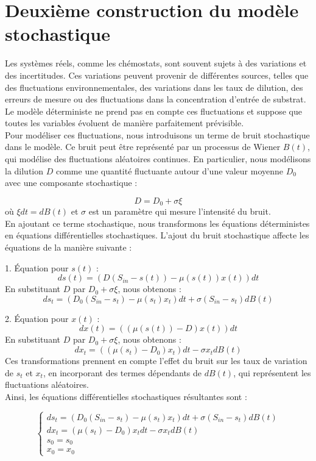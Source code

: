 \documentclass[12pt,a4paper]{report}%
\begin{document}
 \chapter{Deuxième construction du modèle stochastique}
 Les systèmes réels, comme les chémostats, sont souvent sujets à des variations et des incertitudes. Ces variations peuvent provenir de différentes sources, telles que des fluctuations environnementales, des variations dans les taux de dilution, des erreurs de mesure ou des fluctuations dans la concentration d'entrée de substrat. Le modèle déterministe ne prend pas en compte ces fluctuations et suppose que toutes les variables évoluent de manière parfaitement prévisible.\\
 
 Pour modéliser ces fluctuations, nous introduisons un terme de bruit stochastique dans le modèle. Ce bruit peut être représenté par un processus de Wiener \(B(t)\), qui modélise des fluctuations aléatoires continues. En particulier, nous modélisons la dilution \(D\) comme une quantité fluctuante autour d'une valeur moyenne \(D_0\) avec une composante stochastique :
 
 \[ D = D_0 + \sigma \xi \]
 où \(\xi dt = dB(t)\) et \(\sigma\) est un paramètre qui mesure l'intensité du bruit.\\
 
 En ajoutant ce terme stochastique, nous transformons les équations déterministes en équations différentielles stochastiques. L'ajout du bruit stochastique affecte les équations de la manière suivante :
 
 1. Équation pour \(s(t)\) :
 \[
 ds(t) = \left( D \left(S_{in} - s(t)\right) - \mu(s(t)) x(t) \right) dt 
 \]
 En substituant \(D\) par \(D_0 + \sigma \xi\), nous obtenons :
 \[
 ds_t = \left( D_0 \left(S_{in} - s_t\right) - \mu(s_t) x_t \right) dt + \sigma \left(S_{in} - s_t\right) dB(t)
 \]
 
 2. Équation pour \(x(t)\) :
 \[
 dx(t) = \left( (\mu(s(t)) - D) x(t) \right) dt
 \]
 En substituant \(D\) par \(D_0 + \sigma \xi\), nous obtenons :
 \[
 dx_t = \left( (\mu(s_t) - D_0) x_t \right) dt - \sigma x_t dB(t)
 \]
 Ces transformations prennent en compte l'effet du bruit sur les taux de variation de \(s_t\) et \(x_t\), en incorporant des termes dépendants de \(dB(t)\), qui représentent les fluctuations aléatoires.\\
 Ainsi, les équations différentielles stochastiques résultantes sont :
 
 \begin{equation}\label{edss}
 	\begin{cases}
 		ds_t = \left( D_0 \left(S_{in} - s_t\right) - \mu(s_t) x_t \right) dt + \sigma \left(S_{in} - s_t\right) dB(t) \\
 		dx_t = (\mu(s_t) - D_0) x_t  dt - \sigma x_t dB(t) \\
 		s_0 = s_0 \\
 		x_0 = x_0
 	\end{cases}
 \end{equation}
 
\end{document}
